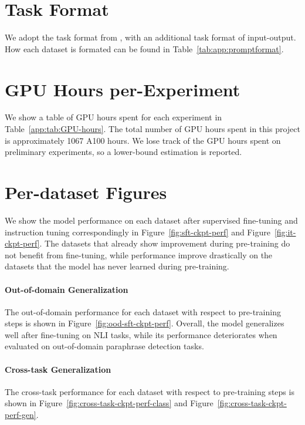 \section{Task Format}
We adopt the task format from \cite{yang2024unveiling}, with an additional task format of input-output.
How each dataset is formated can be found in Table~\ref{tab:app:promptformat}.

\section{GPU Hours per-Experiment}
\label{sec:app:gpuhours}
We show a table of GPU hours spent for each experiment in Table~\ref{app:tab:GPU-hours}.
The total number of GPU hours spent in this project is approximately 1067 A100 hours. We lose track of the GPU hours spent on preliminary experiments, so a lower-bound estimation is reported.


\section{Per-dataset Figures}
\label{sec:app:per-ds-ckpt-figures}


We show the model performance on each dataset after supervised fine-tuning and instruction tuning correspondingly in Figure~\ref{fig:sft-ckpt-perf} and Figure~\ref{fig:it-ckpt-perf}.
The datasets that already show improvement during pre-training do not benefit from fine-tuning, while performance improve drastically on the datasets that the model has never learned during pre-training.

\paragraph{Out-of-domain Generalization}
The out-of-domain performance for each dataset with respect to pre-training steps is shown in Figure~\ref{fig:ood-sft-ckpt-perf}.
Overall, the model generalizes well after fine-tuning on NLI tasks, while its performance deteriorates when evaluated on out-of-domain paraphrase detection tasks.


\paragraph{Cross-task Generalization}
The cross-task performance for each dataset with respect to pre-training steps is shown in Figure~\ref{fig:cross-task-ckpt-perf-class} and Figure~\ref{fig:cross-task-ckpt-perf-gen}.


